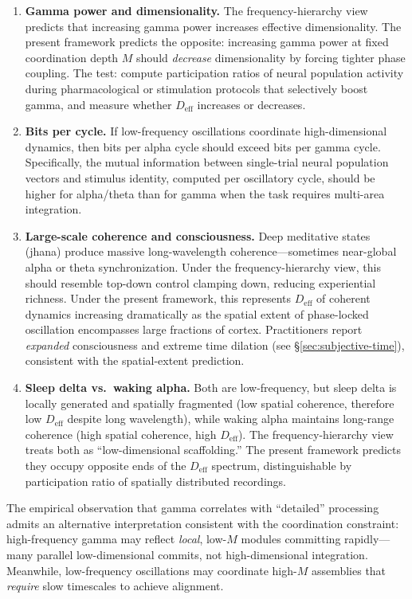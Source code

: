 \documentclass[12pt]{article}
\newcommand{\Deff}{D_{\mathrm{eff}}}
\begin{document}
\begin{enumerate}
\item \textbf{Gamma power and dimensionality.} The frequency-hierarchy view predicts that
increasing gamma power increases effective dimensionality. The present framework predicts
the opposite: increasing gamma power at fixed coordination depth $M$ should
\emph{decrease} dimensionality by forcing tighter phase coupling. The test: compute
participation ratios of neural population activity during pharmacological or stimulation
protocols that selectively boost gamma, and measure whether $\Deff$ increases or decreases.

\item \textbf{Bits per cycle.} If low-frequency oscillations coordinate high-dimensional
dynamics, then bits per alpha cycle should exceed bits per gamma cycle. Specifically,
the mutual information between single-trial neural population vectors and stimulus
identity, computed per oscillatory cycle, should be higher for alpha/theta than for
gamma when the task requires multi-area integration.

\item \textbf{Large-scale coherence and consciousness.} Deep meditative states (jhana)
produce massive long-wavelength coherence---sometimes near-global alpha or theta
synchronization. Under the frequency-hierarchy view, this should resemble top-down
control clamping down, reducing experiential richness. Under the present framework,
this represents $\Deff$ of coherent dynamics increasing dramatically as the spatial
extent of phase-locked oscillation encompasses large fractions of cortex. Practitioners
report \emph{expanded} consciousness and extreme time dilation (see \S\ref{sec:subjective-time}),
consistent with the spatial-extent prediction.

\item \textbf{Sleep delta vs.\ waking alpha.} Both are low-frequency, but sleep delta is
locally generated and spatially fragmented (low spatial coherence, therefore low $\Deff$
despite long wavelength), while waking alpha maintains long-range coherence (high spatial
coherence, high $\Deff$). The frequency-hierarchy view treats both as ``low-dimensional
scaffolding.'' The present framework predicts they occupy opposite ends of the $\Deff$
spectrum, distinguishable by participation ratio of spatially distributed recordings.
\end{enumerate}

The empirical observation that gamma correlates with ``detailed'' processing admits an
alternative interpretation consistent with the coordination constraint: high-frequency
gamma may reflect \emph{local}, low-$M$ modules committing rapidly---many parallel
low-dimensional commits, not high-dimensional integration. Meanwhile, low-frequency
oscillations may coordinate high-$M$ assemblies that \emph{require} slow timescales to
achieve alignment.
\end{document}
